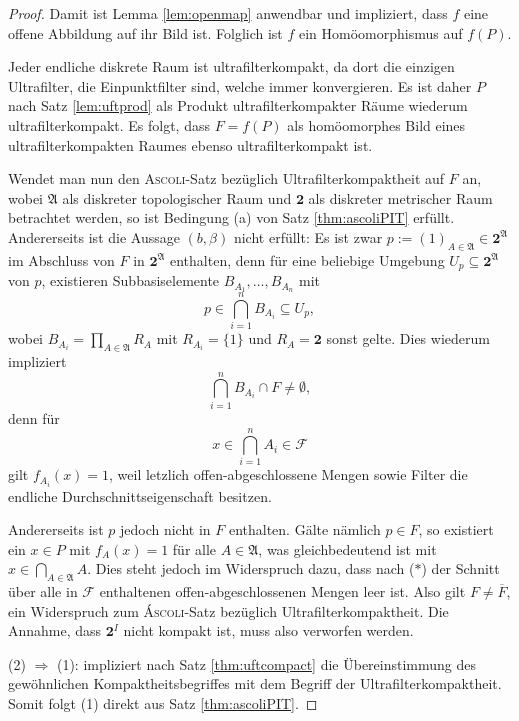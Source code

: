 \begin{proof}
  Damit ist Lemma \ref{lem:openmap} anwendbar und impliziert, dass $f$ eine offene Abbildung auf ihr Bild ist.
  Folglich ist $f$ ein Homöomorphismus auf $f(P)$.

  Jeder endliche diskrete Raum ist ultrafilterkompakt, da dort die einzigen Ultrafilter, die Einpunktfilter sind, welche immer konvergieren.
  Es ist daher $P$ nach Satz \ref{lem:uftprod} als Produkt ultrafilterkompakter Räume wiederum ultrafilterkompakt.
  Es folgt, dass $F = f(P)$ als homöomorphes Bild eines ultrafilterkompakten Raumes ebenso ultrafilterkompakt ist.

  Wendet man nun den \textsc{Ascoli}-Satz bezüglich Ultrafilterkompaktheit auf $F$ an, wobei $\mathfrak{A}$ als diskreter topologischer Raum und $\mathbf{2}$ als diskreter metrischer Raum betrachtet werden, so ist Bedingung (a) von Satz \ref{thm:ascoliPIT} erfüllt.
  Andererseits ist die Aussage $(b, \beta)$ nicht erfüllt:
  Es ist zwar $p := (1)_{A \in \mathfrak{A}} \in \mathbf{2}^\mathfrak{A}$ im Abschluss von $F$ in $\mathbf{2}^\mathfrak{A}$ enthalten, denn für eine beliebige Umgebung $U_p \subseteq \mathbf{2}^\mathfrak{A}$ von $p$, existieren Subbasiselemente $B_{A_1},\dots,B_{A_n}$ mit 
  \begin{displaymath}
    p \in \bigcap_{i=1}^n B_{A_i} \subseteq U_p,
  \end{displaymath}
  wobei $B_{A_i} = \prod_{A \in \mathfrak{A}} R_{A}$ mit  $R_{A_i} = \{1\}$ und $R_A = \mathbf{2}$ sonst gelte.
  Dies wiederum impliziert
  \begin{displaymath}
    \bigcap_{i=1}^n B_{A_i} \cap F \neq \emptyset,
  \end{displaymath}
  denn für 
  \begin{displaymath}
    x \in \bigcap_{i=1}^n A_i \in \mathcal{F}
  \end{displaymath}
  gilt $f_{A_i}(x) = 1$, weil letzlich offen-abgeschlossene Mengen sowie Filter die endliche Durchschnittseigenschaft besitzen.
  
  Andererseits ist $p$ jedoch nicht in $F$ enthalten. 
  Gälte nämlich $p \in F$, so existiert ein $x \in P$ mit $f_A(x) = 1$ für alle $A \in \mathfrak{A}$, was gleichbedeutend ist mit $x \in \bigcap_{A \in \mathfrak{A}} A$.
  Dies steht jedoch im Widerspruch dazu, dass nach ($\ast$) der Schnitt über alle in $\mathcal{F}$ enthaltenen offen-abgeschlossenen Mengen leer ist.
  Also gilt $F \neq \overline{F}$, ein Widerspruch zum \textsc{Áscoli}-Satz bezüglich Ultrafilterkompaktheit.
  Die Annahme, dass $\mathbf{2}^I$ nicht kompakt ist, muss also verworfen werden.

  (2) $\Rightarrow$ (1): \PIT impliziert nach Satz \ref{thm:uftcompact} die Übereinstimmung des gewöhnlichen Kompaktheitsbegriffes mit dem Begriff der Ultrafilterkompaktheit. Somit folgt (1) direkt aus Satz \ref{thm:ascoliPIT}.
\end{proof}

